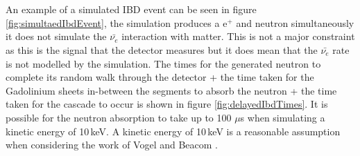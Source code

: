 \\\\An example of a simulated IBD event can be seen in figure \ref{fig:simultaedIbdEvent}, the simulation produces a e$^+$ and neutron simultaneously it does not simulate the $\bar{\nu_e}$ interaction with matter. This is not a major constraint as this is the signal that the detector measures but it does mean that the $\bar{\nu_e}$ rate is not modelled by the simulation. The times for the generated neutron to complete its random walk through the detector + the time taken for the Gadolinium sheets in-between the segments to absorb the neutron + the time taken for the cascade to occur is shown in figure \ref{fig:delayedIbdTimes}. It is possible for the neutron absorption to take up to 100 $\mu$s when simulating a kinetic energy of 10\,keV. A kinetic energy of 10\,keV is a reasonable assumption when considering the work of Vogel and Beacom \cite{Vogel_1999}. 


